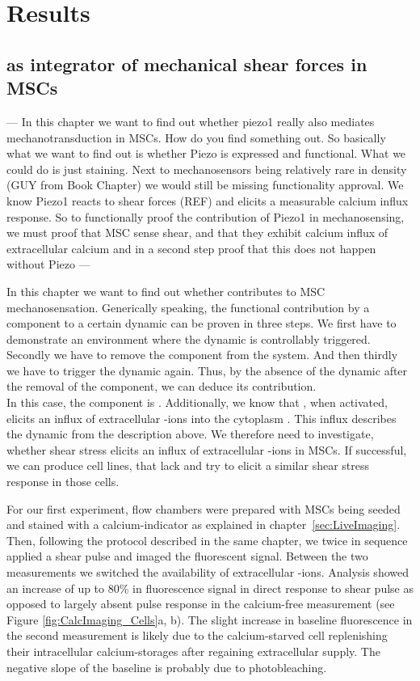 \chapter{Results}



\section{\Piezo{} as integrator of mechanical shear forces in MSCs}
\label{sec:piezo1-as-integrator-of-biomecshanical-events-in-mscs}

---
In this chapter we want to find out whether piezo1 really also mediates mechanotransduction in MSCs. How do you find something out. So basically what we want to find out is whether Piezo is expressed and functional. What we could do is just staining. Next to mechanosensors being relatively rare in density (GUY from Book Chapter) we would still be missing functionality approval. We know Piezo1 reacts to shear forces (REF) and elicits a measurable calcium influx response. So to functionally proof the contribution of Piezo1 in mechanosensing, we must proof that MSC sense shear, and that they exhibit calcium influx of extracellular calcium and in a second step proof that this does not happen without Piezo
---

In this chapter we want to find out whether \Piezo{} contributes to MSC mechanosensation. Generically speaking, the functional contribution by a component to a certain dynamic can be proven in three steps. We first have to demonstrate an environment where the dynamic is controllably triggered. Secondly we have to remove the component from the system. And then thirdly we have to trigger the dynamic again. Thus, by the absence of the dynamic after the removal of the component, we can deduce its contribution. \\
In this case, the component is \Piezo{}. Additionally, we know that \Piezo{}, when activated, elicits an influx of extracellular \calcium{}-ions into the cytoplasm \cite{Coste2010}. This influx describes the dynamic from the description above. We therefore need to investigate, whether shear stress elicits an influx of extracellular \calcium{}-ions in MSCs. If successful, we can produce cell lines, that lack \Piezo{} and try to elicit a similar shear stress response in those cells.

For our first experiment, flow chambers were prepared with MSCs being seeded and stained with a calcium-indicator as explained in chapter~\vref{sec:LiveImaging}. Then, following the protocol described in the same chapter, we twice in sequence applied a shear pulse and imaged the fluorescent signal. Between the two measurements we switched the availability of extracellular \calcium{}-ions. Analysis showed an increase of up to 80\% in fluorescence signal in direct response to shear pulse as opposed to largely absent pulse response in the calcium-free measurement (see Figure \ref{fig:CalcImaging_Cells}a, b). The slight increase in baseline fluorescence in the second  measurement is likely due to the calcium-starved cell replenishing their intracellular calcium-storages after regaining extracellular supply. The negative slope of the baseline is probably due to photobleaching.

